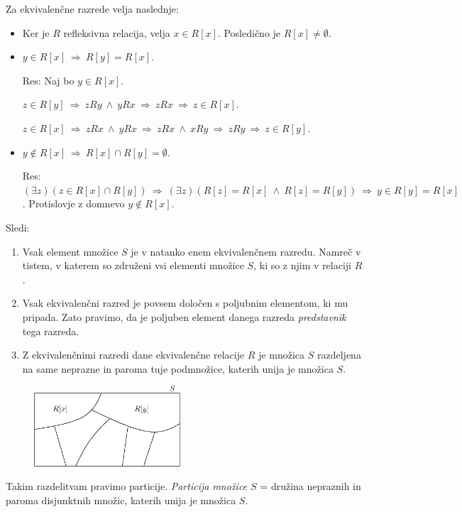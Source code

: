 \documentclass[11pt,paper=b5,footinclude,headinclude]{scrbook} %
\def\inn {{~\wedge~}}
\def\sledi {{~\Rightarrow~}}
\begin{document}
Za ekvivalenčne razrede velja naslednje:
\begin{itemize}
  \item Ker je $R$ refleksivna relacija, velja $x\in R[x]$. Posledično je $R[x]\neq \emptyset$.
  \item $y\in R[x]\sledi R[y]=R[x]$.

  Res: Naj bo $y\in R[x]$.

  $z\in R[y]\sledi zRy\inn yRx\sledi zRx\sledi z\in R[x]$.

  $z\in R[x]\sledi zRx\inn yRx\sledi zRx\inn xRy \sledi zRy\sledi z\in R[y]$.
  \item $y\not\in R[x]\sledi R[x]\cap R[y]=\emptyset$.

  Res: $(\exists z)(z\in R[x]\cap R[y])\sledi (\exists z)(R[z] = R[x]\inn R[z] = R[y])\sledi
  y\in R[y]=R[x]$. Protislovje z domnevo $y\not\in R[x]$.
  \end{itemize}

Sledi:
\begin{enumerate}
  \item Vsak element množice $S$ je v natanko enem ekvivalenčnem razredu. Namreč v tistem, v katerem so združeni vsi elementi množice $S$, ki so z njim v relaciji $R$.
  \item Vsak ekvivalenčni razred je povsem določen s poljubnim elementom, ki mu pripada. Zato pravimo, da je poljuben element danega razreda {\em predstavnik} tega razreda.
      \item Z ekvivalenčnimi razredi dane ekvivalenčne relacije $R$ je množica $S$
      razdeljena na same neprazne in paroma tuje podmnožice, katerih unija je množica $S$.
      \end{enumerate}

\begin{figure}[htp]
\begin{center}
\includegraphics[height=30mm]{ekvivalencna.eps}
\end{center}
\end{figure}

Takim razdelitvam pravimo particije. {\em Particija množice $S$} = družina nepraznih in paroma disjunktnih množic, katerih unija je množica $S$.
\end{document}
